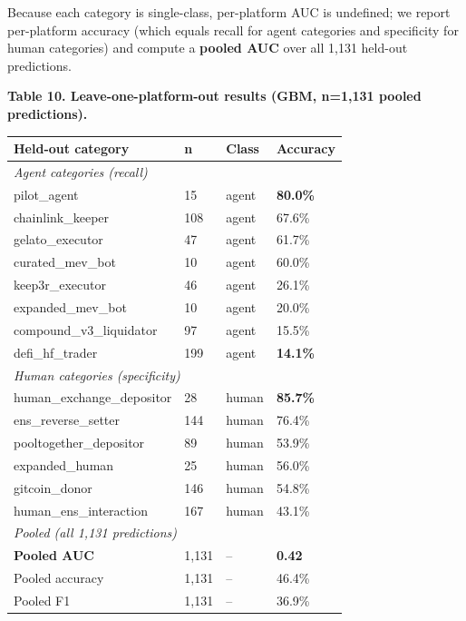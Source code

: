 \documentclass[sigconf,nonacm=false]{acmart}
\begin{document}
Because each category is single-class, per-platform AUC is undefined; we report per-platform accuracy (which equals recall for agent categories and specificity for human categories) and compute a \textbf{pooled AUC} over all 1{,}131 held-out predictions.

\textbf{Table 10. Leave-one-platform-out results (GBM, n=1{,}131 pooled predictions).}

\begin{table}[h]
\centering
\small
\begin{tabular}{llll}
\toprule
Held-out category & n & Class & Accuracy \\
\midrule
\multicolumn{4}{l}{\textit{Agent categories (recall)}} \\
pilot\_agent & 15 & agent & \textbf{80.0\%} \\
chainlink\_keeper & 108 & agent & 67.6\% \\
gelato\_executor & 47 & agent & 61.7\% \\
curated\_mev\_bot & 10 & agent & 60.0\% \\
keep3r\_executor & 46 & agent & 26.1\% \\
expanded\_mev\_bot & 10 & agent & 20.0\% \\
compound\_v3\_liquidator & 97 & agent & 15.5\% \\
defi\_hf\_trader & 199 & agent & \textbf{14.1\%} \\
\midrule
\multicolumn{4}{l}{\textit{Human categories (specificity)}} \\
human\_exchange\_depositor & 28 & human & \textbf{85.7\%} \\
ens\_reverse\_setter & 144 & human & 76.4\% \\
pooltogether\_depositor & 89 & human & 53.9\% \\
expanded\_human & 25 & human & 56.0\% \\
gitcoin\_donor & 146 & human & 54.8\% \\
human\_ens\_interaction & 167 & human & 43.1\% \\
\midrule
\multicolumn{4}{l}{\textit{Pooled (all 1{,}131 predictions)}} \\
\textbf{Pooled AUC} & 1{,}131 & -- & \textbf{0.42} \\
Pooled accuracy & 1{,}131 & -- & 46.4\% \\
Pooled F1 & 1{,}131 & -- & 36.9\% \\
\bottomrule
\end{tabular}
\end{table}
\end{document}

